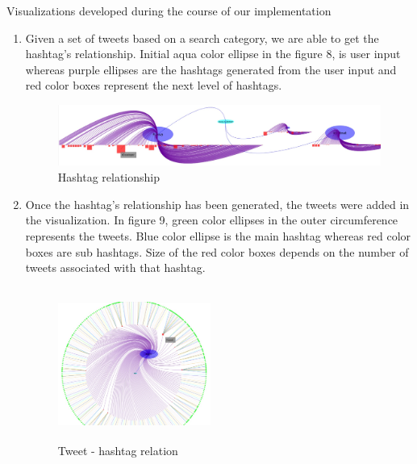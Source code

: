 \documentclass[11pt]{article}
\begin{document}
Visualizations developed during the course of our implementation

\begin{enumerate}
\item Given a set of tweets based on a search category, we are able to get the hashtag's relationship. Initial aqua color ellipse in the figure 8, is user input whereas purple ellipses are the hashtags generated from the user input and red color boxes represent the next level of hashtags.
\begin{figure}[h]
\centering
\includegraphics[width=\textwidth, height=2cm]{JustHashTags.jpg}
\caption{Hashtag relationship}
\end{figure}
\item Once the hashtag's relationship has been generated, the tweets were added in the visualization. In figure 9, green color ellipses in the outer circumference represents the tweets. Blue color ellipse is the main hashtag whereas red color boxes are sub hashtags. Size of the red color boxes depends on the number of tweets associated with that hashtag.

\begin{figure}[h]
\centering
\includegraphics[width=5cm, height=5cm]{HashtagToTweets.jpg}
\caption{Tweet - hashtag relation}
\end{figure}


\end{enumerate}
\end{document}

